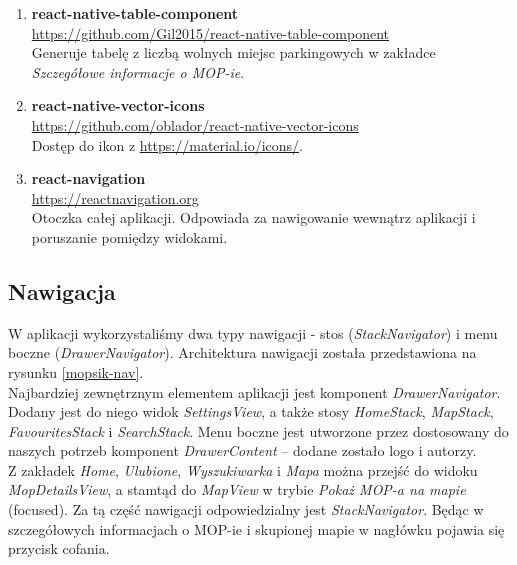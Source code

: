 \begin{enumerate}
\item \textbf{react-native-table-component} \\
\url{https://github.com/Gil2015/react-native-table-component}\\
Generuje tabelę z liczbą wolnych miejsc parkingowych w zakładce \textit{Szczegółowe informacje o MOP-ie}.

\item \textbf{react-native-vector-icons} \\
\url{https://github.com/oblador/react-native-vector-icons}\\
Dostęp do ikon z \url{https://material.io/icons/}.

\item \textbf{react-navigation} \\
\url{https://reactnavigation.org}\\
Otoczka całej aplikacji. Odpowiada za nawigowanie wewnątrz aplikacji i poruszanie pomiędzy widokami.
\end{enumerate}

\subsection{Nawigacja}
W aplikacji wykorzystaliśmy dwa typy nawigacji - stos (\textit{StackNavigator}) i menu boczne (\textit{DrawerNavigator}). Architektura nawigacji została przedstawiona na rysunku \ref{mopsik-nav}.\\


Najbardziej zewnętrznym elementem aplikacji jest komponent \textit{DrawerNavigator}. Dodany jest do niego widok \textit{SettingsView}, a także stosy \textit{HomeStack}, \textit{MapStack}, \textit{FavouritesStack} i \textit{SearchStack}. Menu boczne jest utworzone przez dostosowany do naszych potrzeb komponent \textit{DrawerContent} -- dodane zostało logo i autorzy. \\

Z zakładek \textit{Home}, \textit{Ulubione}, \textit{Wyszukiwarka} i
\textit{Mapa} można przejść do widoku \textit{MopDetailsView}, a stamtąd do
\textit{MapView} w trybie \textit{Pokaż MOP-a na mapie} (focused). Za tą część
nawigacji odpowiedzialny jest \textit{StackNavigator}. Będąc w szczegółowych informacjach o MOP-ie i skupionej mapie w nagłówku pojawia się przycisk cofania.\\

